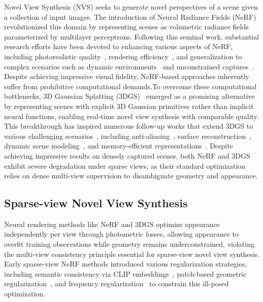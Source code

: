 Novel View Synthesis (NVS) seeks to generate novel perspectives of a scene given a collection of input images. The introduction of Neural Radiance Fields (NeRF)~\cite{mildenhall2021nerf} revolutionized this domain by representing scenes as volumetric radiance fields parameterized by multilayer perceptrons. Following this seminal work, substantial research efforts have been devoted to enhancing various aspects of NeRF, including photorealistic quality~\cite{barron2021mip,barron2022mip360,barron2023zip}, rendering efficiency~\cite{garbin2021fastnerf,fridovich2022plenoxels,muller2022instant,chen2022tensorf}, and generalization to complex scenarios such as dynamic environments~\cite{park2021nerfies,pumarola2021d} and unconstrained captures~\cite{martin2021nerf}. Despite achieving impressive visual fidelity, NeRF-based approaches inherently suffer from prohibitive computational demands.To overcome these computational bottlenecks, 3D Gaussian Splatting (3DGS)~\cite{kerbl20233d} emerged as a promising alternative by representing scenes with explicit 3D Gaussian primitives rather than implicit neural functions, enabling real-time novel view synthesis with comparable quality. This breakthrough has inspired numerous follow-up works that extend 3DGS to various challenging scenarios~\cite{yu2024mip, lu2024scaffold, matsuki2024gaussian, kocabas2024hugs, fu2024colmap, yan2024street}, including anti-aliasing~\cite{yu2024mip}, surface reconstruction~\cite{yu2024gaussian, huang20242d, li2024monogsdf}, dynamic scene modeling~\cite{wu20244d}, and memory-efficient representations~\cite{chen2024hac}. 
Despite achieving impressive results on densely captured scenes, both NeRF and 
3DGS exhibit severe degradation under sparse views, as their standard 
optimization relies on dense multi-view supervision to disambiguate geometry 
and appearance.


\subsection{Sparse-view Novel View Synthesis}
Neural rendering methods like NeRF and 3DGS optimize appearance independently per view through photometric losses, allowing appearance to overfit training observations while geometry remains  underconstrained, violating the multi-view consistency principle essential for sparse-view novel view synthesis.
Early sparse-view NeRF methods introduced various regularization strategies, including semantic consistency via CLIP embeddings~\cite{jain2021dietnerf}, patch-based geometric regularization~\cite{niemeyer2022regnerf}, and frequency regularization~\cite{yang2023freenerf} to constrain this ill-posed optimization. 


